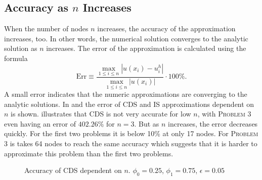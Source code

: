 \documentclass[../00_main.tex]{subfiles}
\begin{document}
 

\subsection{Accuracy as $n$ Increases}

When the number of nodes $n$ increases, the accuracy of the
approximation increases, too. In other words, the numerical solution converges
to the analytic solution as $n$ increases. The error of the approximation is 
calculated using the formula
\begin{equation}\nonumber
    \text{Err} \equiv \frac{\underset{1 \leq i \leq n}{\max}|u(x_i)
        - u^h_i|}{\underset{1 \leq i \leq n}{\max}|u(x_i)|} \cdot 100\%.
\end{equation}
A small error indicates that the numeric approximations are converging to the 
analytic solutions. In  and  the error 
of CDS and IS approximations dependent on $n$ is shown.  
illustrates that CDS is not very accurate for low $n$, with \textsc{Problem 3} 
even having an error of $402.26\%$ for $n=3$. But as $n$ increases, the error 
decreases quickly. For the first two problems it is below 10\% at only 17 
nodes. For \textsc{Problem 3} is takes 64 nodes to reach the same accuracy 
which suggests that it is harder to approximate this problem than the first two 
problems.
\begin{figure}[h]
\centering{}
    \vspace{-20pt}
    \caption{Accuracy of CDS dependent on $n$. 
    $\phi_0=0.25$, $\phi_1=0.75$, $\epsilon=0.05$}
\label{fig:err_cds}
\end{figure}
\end{document}
